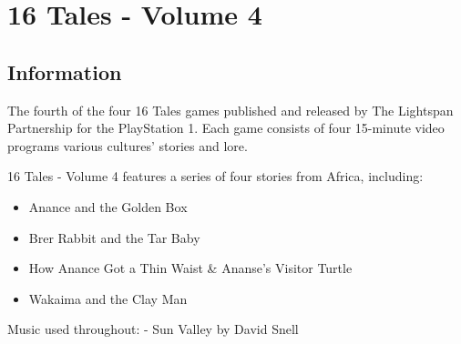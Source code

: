 \chapter{16 Tales - Volume 4}

\section{Information}

The fourth of the four 16 Tales games published and released by The Lightspan Partnership for the PlayStation 1. Each game consists of four 15-minute video programs various cultures' stories and lore.

16 Tales - Volume 4 features a series of four stories from Africa, including:
\begin{itemize}
    \item Anance and the Golden Box
    \item Brer Rabbit and the Tar Baby
    \item How Anance Got a Thin Waist \& Ananse's Visitor Turtle
    \item Wakaima and the Clay Man
\end{itemize}

Music used throughout:
- Sun Valley by David Snell

